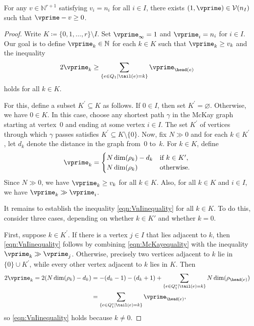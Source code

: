 \begin{Lemma}
\label{lem:VnInon-empty}
For any $v\in \mathbb{N}^{r+1}$ satisfying $v_i=n_i$ for all $i\in I$, there exists $(1,\vprime)\in \mathcal{V}(n_I)$ such that $\vprime-v\geq 0$.
\end{Lemma}
\begin{proof}
Write $K\coloneqq \{0,1,\dots,r\}\setminus I$. Set $\vprime_\infty = 1$ and $\vprime_i=n_i$ for $i\in I$. Our goal is to define $\vprime_k\in \mathbb{N}$ for each $k\in K$ such that $\vprime_k\geq v_k$ and
the inequality
 \begin{equation}
 \label{eqn:VnIinequality}
 2\vprime_k \geq \sum_{\{e \in Q_1\mid \tail(e)=k\}} \vprime_{\head(e)}
 \end{equation}
 holds for all $k\in K$.

 For this, define a subset $K^\prime\subseteq K$ as follows. If $0\in I$, then set $K^\prime=\varnothing$. Otherwise, we have $0\in K$. In this case, choose any shortest path $\gamma$ in the McKay graph starting at vertex~$0$ and ending at some vertex $i\in I$. The set $K^\prime$ of vertices through which $\gamma$ passes satisfies $K^\prime\subseteq K\setminus \{0\}$. Now,
 fix $N\gg 0$ and for each $k\in K^\prime$, let $d_k$ denote the distance in the graph from~$0$ to~$k$. For $k\in K$, define{\samepage
 \[
 \vprime_k= \begin{cases} N\dim(\rho_k) - d_k & \text{if }k\in K^\prime, \\
 N\dim(\rho_k) & \text{otherwise.}
 \end{cases}
 \]
 Since $N\gg 0$, we have $\vprime_k\geq v_k$ for all $k\in K$. Also, for all $k\in K$ and $i\in I$, we have $\vprime_k\gg \vprime_i$.}

 It remains to establish the inequality \eqref{eqn:VnIinequality} for all $k\in K$. To do this, consider three cases, depending on whether $k\in K'$ and whether $k=0$.

 First, suppose $k\in K^\prime$. If there is a vertex $j\in I$ that lies adjacent to $k$, then \eqref{eqn:VnIinequality} follows by combining \eqref{eqn:McKayequality} with the inequality $\vprime_k\gg \vprime_j$. Otherwise, precisely two vertices adjacent to $k$ lie in $\{0\}\cup K^\prime$, while every other vertex adjacent to $k$ lies in $K$. Then
\begin{align*}
2\vprime_k
= 2(N\dim(\rho_k) - d_k) & = -(d_{k}-1)-(d_{k}+1) +\sum_{\{e\in Q_1^*\mid \tail(e)=k\}}N \dim(\rho_{\head(e)})\\
& = \sum_{\{e\in Q_1^*\mid \tail(e)=k\}} \vprime_{\head(e)},
\end{align*}
 so \eqref{eqn:VnIinequality} holds because $k\neq 0$.


\end{proof}

